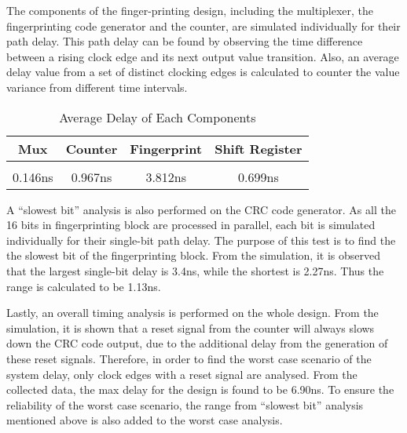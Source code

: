 \documentclass[10pt,journal,compsoc]{IEEEtran}
\begin{document}
    The components of the finger-printing design, including the multiplexer, the fingerprinting code generator and the counter, are simulated individually for their path delay. This path delay can be found by observing the time difference between a rising clock edge and its next output value transition. Also, an average delay value from a set of distinct clocking edges is calculated to counter the value variance from different time intervals.
    
\begin{table}[ht] 
\caption{Average Delay of Each Components} %
\centering %
\begin{tabular}{c c c c } %
\hline\hline %
Mux & Counter & Fingerprint & Shift Register\\ [0.5ex] %
\hline %
\\ [0.2 ex]
0.146ns & 0.967ns & 3.812ns & 0.699ns \\ [1ex] %
\hline %
\end{tabular} 
\label{table:nonlin} %
\end{table} 

    A “slowest bit” analysis is also performed on the CRC code generator. As all the 16 bits in fingerprinting block are processed in parallel, each bit is simulated individually for their single-bit path delay. The purpose of this test is to find the the slowest bit of the fingerprinting block. From the simulation, it is observed that the largest single-bit delay is 3.4ns, while the shortest is 2.27ns. Thus the range is calculated to be 1.13ns.
    
    Lastly, an overall timing analysis is performed on the whole design. From the simulation, it is shown that a reset signal from the counter will always slows down the CRC code output, due to the additional delay from the generation of these reset signals. Therefore, in order to find the worst case scenario of the system delay, only clock edges with a reset signal are analysed. From the collected data, the max delay for the design is found to be 6.90ns. To ensure the reliability of the worst case scenario, the range from “slowest bit” analysis mentioned above is also added to the worst case analysis.
    
\end{document}
